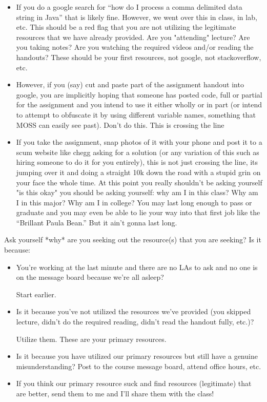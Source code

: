 \documentclass[12pt]{scrartcl}
\begin{document}
\begin{itemize}
  \item If you do a google search for ``how do I process a comma
  delimited data string in Java'' that is likely fine.  However,
  we went over this in class, in lab, etc.  This should be a red
  flag that you are not utilizing the legitimate resources that
  we have already provided.  Are you "attending" lecture?  Are
  you taking notes?  Are you watching the required videos and/or
  reading the handouts?  These should be your first resources,
  not google, not stackoverflow, etc.
  \item However, if you (say) cut and paste part of the assignment
  handout into google, you are implicitly hoping that someone has
  posted code, full or partial for the assignment and you intend
  to use it either wholly or in part (or intend to attempt to
  obfuscate it by using different variable names, something that
  MOSS can easily see past).  Don't do this.  This is crossing the line
  \item If you take the assignment, snap photos of it with your
  phone and post it to a scum website like chegg asking for a
  solution (or any variation of this such as hiring someone to do
  it for you entirely), this is not just crossing the line, its
  jumping over it and doing a straight 10k down the road with a
  stupid grin on your face the whole time.  At this point you
  really shouldn't be asking yourself "is this okay" you should
  be asking yourself: why am I in this class?  Why am I in this
  major?  Why am I in college?  You may last long enough to pass
  or graduate and you may even be able to lie your way into that
  first job like the ``Brillant Paula Bean.''  But it ain't
  gonna last long.
\end{itemize}

Ask yourself *why* are you seeking out the resource(s) that you
are seeking?  Is it because:

\begin{itemize}
  \item You're working at the last minute and there are no LAs
  to ask and no one is on the message board because we're all asleep?

  Start earlier.

  \item Is it because you've not utilized the resources we've
  provided (you skipped lecture, didn't do the required reading,
  didn't read the handout fully, etc.)?

  Utilize them.  These are your primary resources.

  \item Is it because you have utilized our primary resources
  but still have a genuine misunderstanding?  Post to the course
  message board, attend office hours, etc.

  \item If you think our primary resource suck and find resources
  (legitimate) that are better, send them to me and I'll share
  them with the class!
\end{itemize}
\end{document}
